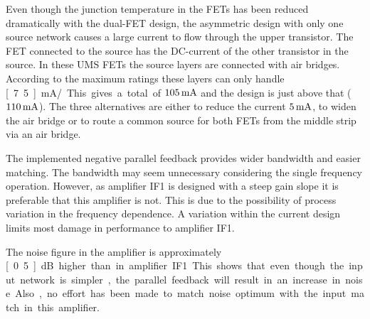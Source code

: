 			Even though the junction temperature in the FETs has been reduced dramatically with the dual-FET design, the asymmetric design with only one source network causes a large current to flow through the upper transistor. The FET connected to the source has the DC-current of the other transistor in the source. In these UMS FETs the source layers are connected with \unit[14]{\mum} air bridges. According to the maximum ratings these layers can only handle \unit[7.5]{mA/\mum}. This gives a total of $\unit[105]{mA}$ and the design is just above that ($\unit[110]{mA}$). The three alternatives are either to reduce the current $\unit[5]{mA}$, to widen the air bridge \unit[1]{\mum} or to route a common source for both FETs from the middle strip via an air bridge.

			The implemented negative parallel feedback provides wider bandwidth and easier matching. The bandwidth may seem unnecessary considering the single frequency operation. However, as amplifier IF1 is designed with a steep gain slope it is preferable that this amplifier is not. This is due to the possibility of process variation in the frequency dependence. A variation within the current design limits most damage in performance to amplifier IF1.

			The noise figure in the amplifier is approximately \unit[0.5]{dB} higher than in amplifier IF1. This shows that even though the input network is simpler, the parallel feedback will result in an increase in noise. Also, no effort has been made to match noise optimum with the input match in this amplifier.



